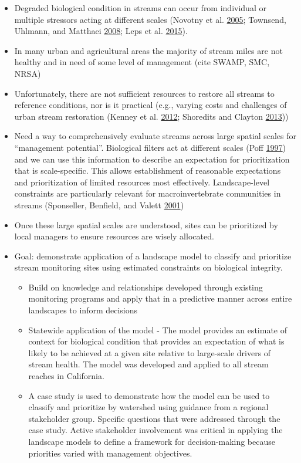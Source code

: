 \documentclass[]{article}
\providecommand{\tightlist}{%
  \setlength{\itemsep}{0pt}\setlength{\parskip}{0pt}}
\begin{document}
\begin{itemize}
\item
  Degraded biological condition in streams can occur from individual or
  multiple stressors acting at different scales (Novotny et al.
  \protect\hyperlink{ref-Novotny05}{2005}; Townsend, Uhlmann, and
  Matthaei \protect\hyperlink{ref-Townsend08}{2008}; Leps et al.
  \protect\hyperlink{ref-Leps15}{2015}).
\item
  In many urban and agricultural areas the majority of stream miles are
  not healthy and in need of some level of management (cite SWAMP, SMC,
  NRSA)
\item
  Unfortunately, there are not sufficient resources to restore all
  streams to reference conditions, nor is it practical (e.g., varying
  costs and challenges of urban stream restoration (Kenney et al.
  \protect\hyperlink{ref-Kenney12}{2012}; Shoredits and Clayton
  \protect\hyperlink{ref-Shoredits13}{2013}))
\item
  Need a way to comprehensively evaluate streams across large spatial
  scales for ``management potential''. Biological filters act at
  different scales (Poff \protect\hyperlink{ref-Poff97}{1997}) and we
  can use this information to describe an expectation for prioritization
  that is scale-specific. This allows establishment of reasonable
  expectations and prioritization of limited resources most effectively.
  Landscape-level constraints are particularly relevant for
  macroinvertebrate communities in streams (Sponseller, Benfield, and
  Valett \protect\hyperlink{ref-Sponseller01}{2001})
\item
  Once these large spatial scales are understood, sites can be
  prioritized by local managers to ensure resources are wisely
  allocated.
\item
  Goal: demonstrate application of a landscape model to classify and
  prioritize stream monitoring sites using estimated constraints on
  biological integrity.

  \begin{itemize}
  \tightlist
  \item
    Build on knowledge and relationships developed through existing
    monitoring programs and apply that in a predictive manner across
    entire landscapes to inform decisions
  \item
    Statewide application of the model - The model provides an estimate
    of context for biological condition that provides an expectation of
    what is likely to be achieved at a given site relative to
    large-scale drivers of stream health. The model was developed and
    applied to all stream reaches in California.
  \item
    A case study is used to demonstrate how the model can be used to
    classify and prioritize by watershed using guidance from a regional
    stakeholder group. Specific questions that were addressed through
    the case study. Active stakeholder involvement was critical in
    applying the landscape models to define a framework for
    decision-making because priorities varied with management
    objectives.
  \end{itemize}
\end{itemize}
\end{document}
